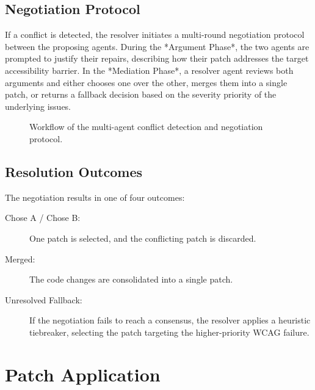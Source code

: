 \subsection{Negotiation Protocol}
\label{sec:negotiation}

If a conflict is detected, the resolver initiates a multi-round negotiation protocol between the proposing agents. During the *Argument Phase*, the two agents are prompted to justify their repairs, describing how their patch addresses the target accessibility barrier. In the *Mediation Phase*, a resolver agent reviews both arguments and either chooses one over the other, merges them into a single patch, or returns a fallback decision based on the severity priority of the underlying issues.

\begin{figure}[htbp]
  \centering
  \caption{Workflow of the multi-agent conflict detection and negotiation protocol.}
  \label{fig:conflict-workflow}
\end{figure}

\subsection{Resolution Outcomes}
\label{sec:resolution-outcomes}

The negotiation results in one of four outcomes:
\begin{description}
    \item[Chose A / Chose B:] One patch is selected, and the conflicting patch is discarded.
    \item[Merged:] The code changes are consolidated into a single patch.
    \item[Unresolved Fallback:] If the negotiation fails to reach a consensus, the resolver applies a heuristic tiebreaker, selecting the patch targeting the higher-priority WCAG failure.
\end{description}


\section{Patch Application}
\label{sec:patch-application}

